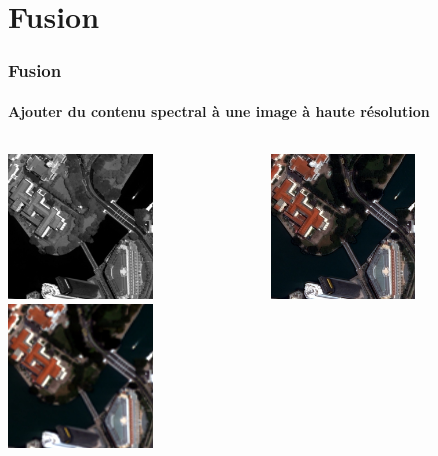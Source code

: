 \documentclass[compress]{beamer}
\begin{document}
\section{Fusion}

\begin{frame}
  \frametitle{Fusion}
  \framesubtitle{Ajouter du contenu spectral à une image à haute résolution}
\centering
\begin{columns}
\begin{column}{0.45\textwidth}
 \includegraphics[width=0.6\textwidth]{panSharp-pan-extract.jpg}\\
 \includegraphics[width=0.6\textwidth]{panSharp-xs-extract.jpg}
\end{column}
\begin{column}{0.45\textwidth}
 \includegraphics[width=0.6\textwidth]{panSharp-extract.jpg}

\end{column}
\end{columns}
\end{frame}
\end{document}
